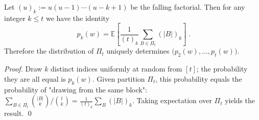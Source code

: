 \begin{corollary}\label{cor:pom-partition-extract-power-sums}
Let \((u)_k:=u(u-1)\cdots(u-k+1)\) be the falling factorial.
Then for any integer \(k\le t\) we have the identity
\[
\boxed{\;
p_k(w)=\mathbb{E}\left[\frac{1}{(t)_k}\sum_{B\in\Pi_t}(|B|)_k\right]\; }.
\]
Therefore the distribution of \(\Pi_t\) uniquely determines \(\bigl(p_2(w),\dots,p_t(w)\bigr)\).
\end{corollary}
\begin{proof}
Draw \(k\) distinct indices uniformly at random from \([t]\); the probability they are all equal is \(p_k(w)\).
Given partition \(\Pi_t\), this probability equals the probability of "drawing from the same block":
\(
\sum_{B\in\Pi_t}\binom{|B|}{k}/\binom{t}{k}
=\frac{1}{(t)_k}\sum_{B}(|B|)_k
\).
Taking expectation over \(\Pi_t\) yields the result. \qed
\end{proof}

